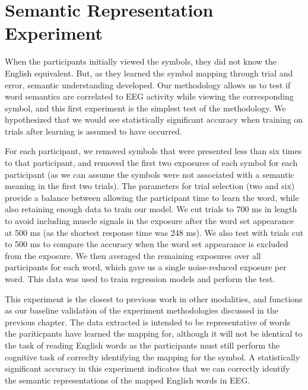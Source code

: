 \section{Semantic Representation Experiment}
\label{sec:experiments:semanticrepresentation}
When the participants initially viewed the symbols, they did not know the 
English equivalent. But, as they learned the symbol mapping through trial and 
error, semantic understanding developed. Our methodology allows us to test if 
word semantics are correlated to EEG activity while viewing the corresponding 
symbol, and this first experiment is the simplest test of the methodology. We 
hypothesized that we would see statistically significant accuracy when training 
on trials after learning is assumed to have occurred.

For each participant, we removed symbols that were presented less than six 
times to that participant, and removed the first two exposures of each symbol 
for each participant (as we can assume the symbols were not associated with a 
semantic meaning in the first two trials). The parameters for trial selection 
(two and six) provide a balance between allowing the participant time to learn 
the word, while also retaining enough data to train our model. We cut trials to 
700 ms in length to avoid including muscle signals in the exposure after the 
word set appearance at 500 ms (as the shortest response time was 248 ms).  We 
also test with trials cut to 500 ms to compare the \tvt accuracy when the word 
set appearance is excluded from the exposure. We then averaged the remaining 
exposures over all participants for each word, which gave us a single 
noise-reduced exposure per word. This data was used to train regression models 
and perform the \tvt test. 

This experiment is the closest to previous work in other modalities, and 
functions as our baseline validation of the experiment methodologies discussed 
in the previous chapter. The data extracted is intended to be representative of 
words the pariticpants have learned the mapping for, although it will not be 
identical to the task of reading English words as the participants must still 
perform the cognitive task of correclty identifying the mapping for the symbol.  
A statistically significant \tvt accuracy in this experiment indicates that we 
can correctly identify the semantic representations of the mapped English words 
in EEG.
